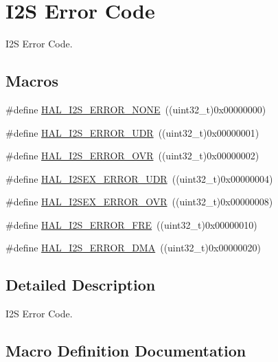 \hypertarget{group___i2_s___error___code}{}\section{I2S Error Code}
\label{group___i2_s___error___code}


I2S Error Code.  


\subsection*{Macros}
\begin{DoxyCompactItemize}
\item 
\#define \hyperlink{group___i2_s___error___code_ga33ddce8f08b6679386cb5f119a4ec61f}{H\+A\+L\+\_\+\+I2\+S\+\_\+\+E\+R\+R\+O\+R\+\_\+\+N\+O\+NE}~((uint32\+\_\+t)0x00000000)
\item 
\#define \hyperlink{group___i2_s___error___code_ga1c4ae6b04b16718ed666cf46d14bf19e}{H\+A\+L\+\_\+\+I2\+S\+\_\+\+E\+R\+R\+O\+R\+\_\+\+U\+DR}~((uint32\+\_\+t)0x00000001)
\item 
\#define \hyperlink{group___i2_s___error___code_gad8e43b3c6ff9233ea7c233f414bd2201}{H\+A\+L\+\_\+\+I2\+S\+\_\+\+E\+R\+R\+O\+R\+\_\+\+O\+VR}~((uint32\+\_\+t)0x00000002)
\item 
\#define \hyperlink{group___i2_s___error___code_ga0e1bf324ee34f7effa24848c8433c497}{H\+A\+L\+\_\+\+I2\+S\+E\+X\+\_\+\+E\+R\+R\+O\+R\+\_\+\+U\+DR}~((uint32\+\_\+t)0x00000004)
\item 
\#define \hyperlink{group___i2_s___error___code_ga09abad1fb22c286494ead507e6ccaaa5}{H\+A\+L\+\_\+\+I2\+S\+E\+X\+\_\+\+E\+R\+R\+O\+R\+\_\+\+O\+VR}~((uint32\+\_\+t)0x00000008)
\item 
\#define \hyperlink{group___i2_s___error___code_ga17188c30af3f60023b4f60bcf7b9099b}{H\+A\+L\+\_\+\+I2\+S\+\_\+\+E\+R\+R\+O\+R\+\_\+\+F\+RE}~((uint32\+\_\+t)0x00000010)
\item 
\#define \hyperlink{group___i2_s___error___code_ga35de5c864ec5a042193f271af1960195}{H\+A\+L\+\_\+\+I2\+S\+\_\+\+E\+R\+R\+O\+R\+\_\+\+D\+MA}~((uint32\+\_\+t)0x00000020)
\end{DoxyCompactItemize}


\subsection{Detailed Description}
I2S Error Code. 



\subsection{Macro Definition Documentation}
